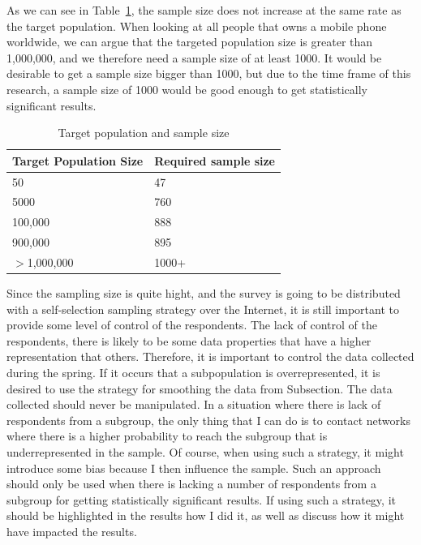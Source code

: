     As we can see in Table~\ref{tab:sampleSize}, the sample size does not increase at the same rate as the target population. When looking at all people that owns a mobile phone worldwide, we can argue that the targeted population size is greater than 1,000,000, and we therefore need a sample size of at least 1000. It would be desirable to get a sample size bigger than 1000, but due to the time frame of this research, a sample size of 1000 would be good enough to get statistically significant results.

      \begin{table}[H]
        \begin{tabular}{| p{5cm} | p{5cm} |}
          \hline
          {\bf Target Population Size} & {\bf Required sample size} \\ \hline
          50 & 47 \\
          5000 & 760 \\ 
          100,000 & 888 \\
          900,000 & 895 \\ 
          $>$1,000,000 & 1000+ \\ \hline
        \end{tabular}
        \caption{Target population and sample size \cite{empiriske}}
        \label{tab:sampleSize}
      \end{table}

    Since the sampling size is quite hight, and the survey is going to be distributed with a self-selection sampling strategy over the Internet, it is still important to provide some level of control of the respondents. The lack of control of the respondents, there is likely to be some data properties that have a higher representation that others. Therefore, it is important to control the data collected during the spring. If it occurs that a subpopulation is overrepresented, it is desired to use the strategy for smoothing the data from Subsection. The data collected should never be manipulated. In a situation where there is lack of respondents from a subgroup, the only thing that I can do is to contact networks where there is a higher probability to reach the subgroup that is underrepresented in the sample. Of course, when using such a strategy, it might introduce some bias because I then influence the sample. Such an approach should only be used when there is lacking a number of respondents from a subgroup for getting statistically significant results. If using such a strategy, it should be highlighted in the results how I did it, as well as discuss how it might have impacted the results. 

